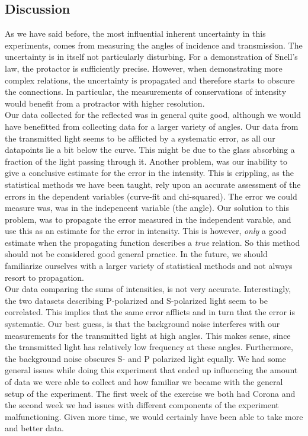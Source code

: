 \documentclass[working]{inputs/tuftebook}
\begin{document}
\subsection*{Discussion}
As we have said before, the most influential inherent uncertainty in this experiments, comes from measuring the angles of incidence and transmission. The uncertainty is in itself not particularly disturbing. For a demonstration of Snell's law, the protactor is sufficiently precise. However, when demonstrating more complex relations, the uncertainty is propagated and therefore starts to obscure the connections. In particular, the measurements of conservations of intensity would benefit from a protractor with higher resolution. \\
Our data collected for the reflected was in general quite good, although we would have benefitted from collecting data for a larger variety of angles. Our data from the transmitted light seems to be afflicted by a systematic error, as all our datapoints lie a bit below the curve. This might be due to the glass absorbing a fraction of the light passing through it. 
Another problem, was our inability to give a conclusive estimate for the error in the intensity. This is crippling, as the statistical methods we have been taught, rely upon an accurate assessment of the errors in the dependent variables (curve-fit and chi-squared). The error we could measure was, was in the indepencent variable (the angle). Our solution to this problem, was to propagate the error measured in the independent varable, and use this as an estimate for the error in intensity. This is however, \textit{only} a good estimate when the propagating function describes a \textit{true} relation. So this method should not be considered good general practice. In the future, we should familiarize ourselves with a larger variety of statistical methods and not always resort to propagation. \\
Our data comparing the sums of intensities, is not very accurate. Interestingly, the two datasets describing P-polarized and S-polarized light seem to be correlated. This implies that the same error afflicts and in turn that the error is systematic. Our best guess, is that the background noise interferes with our measurements for the transmitted light at high angles. This makes sense, since the transmitted light has relatively low frequency at these angles. Furthermore, the background noise obscures S- and P polarized light equally.
We had some general issues while doing this experiment that ended up influencing the amount of data we were able to collect and how familiar we became with the general setup of the experiment. The first week of the exercise we both had Corona and the second week we had issues with different components of the experiment malfunctioning. Given more time, we would certainly have been able to take more and better data.
\end{document}
